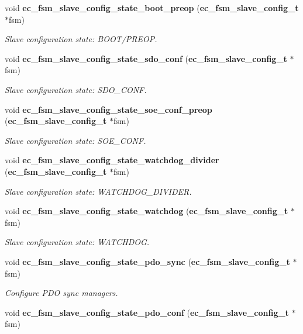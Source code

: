 \begin{DoxyCompactItemize}
void {\bf ec\-\_\-fsm\-\_\-slave\-\_\-config\-\_\-state\-\_\-boot\-\_\-preop} ({\bf ec\-\_\-fsm\-\_\-slave\-\_\-config\-\_\-t} $\ast$fsm)
\begin{DoxyCompactList}\small\item\em Slave configuration state\-: B\-O\-O\-T/\-P\-R\-E\-O\-P. \end{DoxyCompactList}\item 
void {\bf ec\-\_\-fsm\-\_\-slave\-\_\-config\-\_\-state\-\_\-sdo\-\_\-conf} ({\bf ec\-\_\-fsm\-\_\-slave\-\_\-config\-\_\-t} $\ast$fsm)
\begin{DoxyCompactList}\small\item\em Slave configuration state\-: S\-D\-O\-\_\-\-C\-O\-N\-F. \end{DoxyCompactList}\item 
void {\bf ec\-\_\-fsm\-\_\-slave\-\_\-config\-\_\-state\-\_\-soe\-\_\-conf\-\_\-preop} ({\bf ec\-\_\-fsm\-\_\-slave\-\_\-config\-\_\-t} $\ast$fsm)
\begin{DoxyCompactList}\small\item\em Slave configuration state\-: S\-O\-E\-\_\-\-C\-O\-N\-F. \end{DoxyCompactList}\item 
void {\bf ec\-\_\-fsm\-\_\-slave\-\_\-config\-\_\-state\-\_\-watchdog\-\_\-divider} ({\bf ec\-\_\-fsm\-\_\-slave\-\_\-config\-\_\-t} $\ast$fsm)
\begin{DoxyCompactList}\small\item\em Slave configuration state\-: W\-A\-T\-C\-H\-D\-O\-G\-\_\-\-D\-I\-V\-I\-D\-E\-R. \end{DoxyCompactList}\item 
void {\bf ec\-\_\-fsm\-\_\-slave\-\_\-config\-\_\-state\-\_\-watchdog} ({\bf ec\-\_\-fsm\-\_\-slave\-\_\-config\-\_\-t} $\ast$fsm)
\begin{DoxyCompactList}\small\item\em Slave configuration state\-: W\-A\-T\-C\-H\-D\-O\-G. \end{DoxyCompactList}\item 
void {\bf ec\-\_\-fsm\-\_\-slave\-\_\-config\-\_\-state\-\_\-pdo\-\_\-sync} ({\bf ec\-\_\-fsm\-\_\-slave\-\_\-config\-\_\-t} $\ast$fsm)
\begin{DoxyCompactList}\small\item\em Configure P\-D\-O sync managers. \end{DoxyCompactList}\item 
void {\bf ec\-\_\-fsm\-\_\-slave\-\_\-config\-\_\-state\-\_\-pdo\-\_\-conf} ({\bf ec\-\_\-fsm\-\_\-slave\-\_\-config\-\_\-t} $\ast$fsm)

\end{DoxyCompactItemize}
